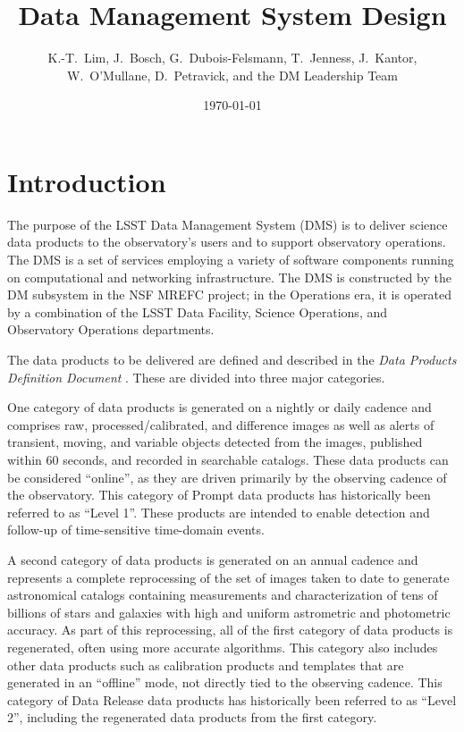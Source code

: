 \documentclass[DM,toc,lsstdraft]{lsstdoc}
\title{Data Management System Design}
\author{
  K.-T.~Lim,
  J.~Bosch,
  G.~Dubois-Felsmann,
  T.~Jenness,
  J.~Kantor,
  W.~O'Mullane,
  D.~Petravick,
  and
  the DM Leadership Team}
\date{\today}
\begin{document}
\maketitle

\section{Introduction}\label{introduction}

The purpose of the LSST Data Management System (DMS) is to deliver science data
products to the observatory's users and to support observatory operations.  The
DMS is a set of services employing a variety of software components running on
computational and networking infrastructure.  The DMS is constructed by the DM
subsystem in the NSF MREFC project; in the Operations era, it is operated by a
combination of the LSST Data Facility, Science Operations, and Observatory
Operations departments.

The data products to be delivered are defined and described in the \textit{Data
Products Definition Document} . These are divided into three
major categories.

One category of data products is generated on a nightly or daily cadence
and comprises raw, processed/calibrated, and difference images as well as alerts
of transient, moving, and variable objects detected from the images,
published within 60 seconds, and recorded in searchable catalogs. These
data products can be considered ``online'', as they are driven primarily
by the observing cadence of the observatory. This category of Prompt data products has
historically been referred to as ``Level 1''.  These products are intended to
enable detection and follow-up of time-sensitive time-domain events.

A second category of data products is generated on an annual cadence and
represents a complete reprocessing of the set of images taken to date to
generate astronomical catalogs containing measurements and
characterization of tens of billions of stars and galaxies with high and
uniform astrometric and photometric accuracy. As part of this
reprocessing, all of the first category of data products is regenerated,
often using more accurate algorithms. This category also includes other
data products such as calibration products and templates that are
generated in an ``offline'' mode, not directly tied to the observing
cadence. This category of Data Release data products has historically been referred to as ``Level 2'',
including the regenerated data products from the first category.
\end{document}
